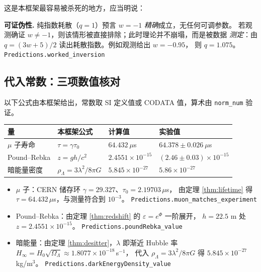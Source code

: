 \documentclass[11pt,a4paper]{article}
\theoremstyle{sudef}
\newcommand{\lean}[1]{\hfill{\small\color{lncol}\texttt{#1}}}
\begin{document}
这是本框架最容易被杀死的地方，应当明说：

\begin{mdframed}[linecolor=red!60!black,linewidth=0.9pt,backgroundcolor=red!3]
\textbf{可证伪性.} 纯指数耗散（$q=1$）预言 $w=-1$ \emph{精确}成立，无任何可调参数。
若观测确证 $w\ne-1$，则该情形被直接排除；此时理论并不崩塌，而是被数据
\emph{测定}：由 $q=(3w+5)/2$ 读出耗散指数。例如观测给出 $w=-0.95$，
则 $q=1.075$。\lean{Predictions.worked\_inversion}
\end{mdframed}

\subsection{代入常数：三项数值核对}

以下公式由本框架给出，常数取 SI 定义值或 CODATA 值，算术由 \texttt{norm\_num} 验证。

\begin{center}
\begin{tabular}{llll}
\toprule
量 & 本框架公式 & 计算值 & 实验值 \\
\midrule
$\mu$ 子寿命 & $\tau=\gamma\tau_0$ & $64.432\ \mu$s & $64.378\pm0.026\ \mu$s \\
Pound–Rebka & $z=gh/c^2$ & $2.4551\times10^{-15}$ & $(2.46\pm0.03)\times10^{-15}$ \\
暗能量密度 & $\rho_\Lambda=3\lambda^2/8\pi G$ & $5.845\times10^{-27}$ & $5.86\times10^{-27}$ \\
\bottomrule
\end{tabular}
\end{center}

\begin{itemize}[leftmargin=1.6em]
\item $\mu$ 子：CERN 储存环 $\gamma=29.327$、$\tau_0=2.19703\,\mu$s，
      由定理 \ref{thm:lifetime} 得 $\tau=64.432\,\mu$s，与测量符合到 $10^{-3}$。
      \lean{Predictions.muon\_matches\_experiment}
\item Pound–Rebka：由定理 \ref{thm:redshift} 的 $\varepsilon=e^{\Phi}$ 一阶展开，
      $h=22.5$ m 处 $z=2.4551\times10^{-15}$。
      \lean{Predictions.poundRebka\_value}
\item 暗能量：由定理 \ref{thm:desitter}，$\lambda$ 即渐近 Hubble 率
      $H_\infty=H_0\sqrt{\Omega_\Lambda}\approx1.8077\times10^{-18}\,$s$^{-1}$，
      代入 $\rho_\Lambda=3\lambda^2/8\pi G$ 得 $5.845\times10^{-27}$ kg/m$^3$。
      \lean{Predictions.darkEnergyDensity\_value}
\end{itemize}
\end{document}
